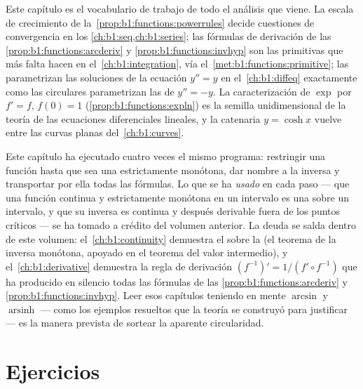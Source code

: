 \begin{remark}\label{rem:b1:functions:whereused}
Este capítulo es el vocabulario de trabajo de todo el análisis que
viene. La escala de crecimiento de
la~\cref{prop:b1:functions:powerrules} decide cuestiones de
convergencia en los \cref{ch:b1:seq,ch:b1:series}; las fórmulas de
derivación de las \cref{prop:b1:functions:arcderiv}
y \cref{prop:b1:functions:invhyp} son las primitivas que más falta
hacen en el~\cref{ch:b1:integration}, vía
el~\cref{met:b1:functions:primitive}; las 
parametrizan las soluciones de la ecuación $y'' = y$ en
el~\cref{ch:b1:diffeq} exactamente como las circulares parametrizan las
de $y'' = -y$. La caracterización de $\exp$ por $f' = f$, $f(0) = 1$
(\cref{prop:b1:functions:expln}) es la semilla unidimensional de la
teoría de las ecuaciones diferenciales lineales, y la catenaria
$y = \cosh x$ vuelve entre las curvas planas del~\cref{ch:b1:curves}.
\end{remark}

\begin{remark}\label{rem:b1:functions:interlude}
Este capítulo ha ejecutado cuatro veces el mismo programa: restringir
una función hasta que sea una  estrictamente monótona, dar
nombre a la inversa y transportar por ella todas las fórmulas. Lo que
se ha \emph{usado} en cada paso --- que una función continua y
estrictamente monótona en un intervalo es una  sobre un
intervalo, y que su inversa es continua y después derivable fuera de
los puntos críticos --- se ha tomado a crédito del volumen anterior. La
deuda se salda dentro de este volumen: el~\cref{ch:b1:continuity}
demuestra el  sobre la  (el teorema de la inversa
monótona, apoyado en el teorema del valor intermedio), y
el~\cref{ch:b1:derivative} demuestra la regla de derivación
$(f^{-1})' = 1/(f' \circ f^{-1})$ que ha producido en silencio todas
las fórmulas de las \cref{prop:b1:functions:arcderiv}
y \cref{prop:b1:functions:invhyp}. Leer esos capítulos teniendo en
mente $\arcsin$ y $\operatorname{arsinh}$ --- como los ejemplos
resueltos que la teoría se construyó para justificar --- es la manera
prevista de sortear la aparente circularidad.
\end{remark}

\section{Ejercicios}

